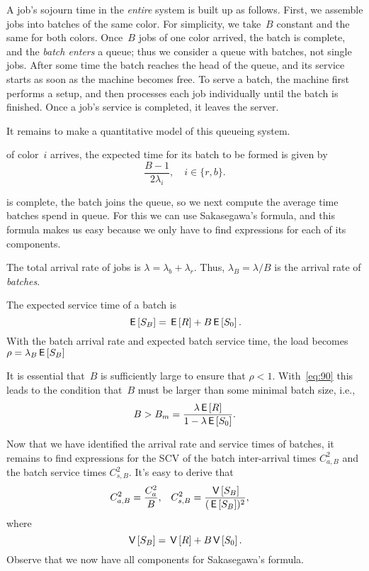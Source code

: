 \documentclass[stochastic-or.tex]{subfiles}
\begin{document}
A job's sojourn time in the \emph{entire} system is built up as follows.
First, we assemble jobs into batches of the same color.
For simplicity, we take~$B$ constant and the same for both colors.
Once~$B$ jobs of one color arrived, the batch is complete, and the \emph{batch enters} a queue; thus we consider a queue with batches, not single jobs.
After some time the batch reaches the head of the queue, and its service starts as soon as the machine becomes free.
To serve a batch, the machine first performs a setup, and then processes each job individually until the batch is finished.
Once a job's service is completed, it leaves the server.

It remains to make a quantitative model of this queueing system.


 of color~$i$ arrives, the expected time for its batch to be formed is given by
\begin{equation}\label{eq:79}
\frac{B-1}{2\lambda_i}, \quad i\in \{r, b\}.
\end{equation}

 is complete, the batch joins the queue, so we next compute the average time batches spend in queue.
For this we can use Sakasegawa's formula, and this formula makes us easy because we only have to find expressions for each of its components.

The total arrival rate of jobs is $\lambda= \lambda_b+\lambda_r$. Thus, $\lambda_B=\lambda/B$ is the arrival rate of \emph{batches}.

The expected service time of a batch is
\begin{equation}\label{eq:90}
\,\mathsf{E}\left[S_B\right] = \,\mathsf{E}\left[R\right] + B\,\mathsf{E}\left[S_0\right].
\end{equation}
With the batch arrival rate and expected batch service time, the load becomes  $\rho = \lambda_B \,\mathsf{E}\left[S_B\right]$

It is essential that~$B$ is sufficiently large to ensure that $\rho<1$.
With~\cref{eq:90} this leads to the condition that~$B$ must be larger than some minimal batch size, i.e.,
\begin{equation*}
B> B_m = \frac{\lambda \,\mathsf{E}\left[R\right]}{1-\lambda \,\mathsf{E}\left[S_0\right]}.
\end{equation*}

Now that we have identified the arrival rate and service times of batches, it remains to find expressions for the SCV of the batch inter-arrival times $C_{a,B}^2$ and the batch service times $C_{s,B}^2$. It's easy to derive that
 \begin{align}\label{eq:82}
C_{a,B}^2 &= \frac{C_{a}^2}B, &
C_{s, B}^2 &= \frac{\,\mathsf{V}\left[S_B\right]}{(\,\mathsf{E}\left[S_B\right])^2},
\end{align}
where
\begin{equation*}
  \,\mathsf{V}\left[S_B\right] = \,\mathsf{V}\left[R\right]  + B \,\mathsf{V}\left[S_0\right].
\end{equation*}
Observe that we now have all components for Sakasegawa's formula.
\end{document}
